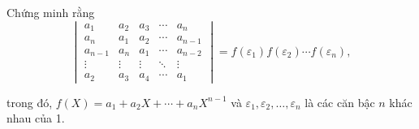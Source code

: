 \begin{exercise}
    Chứng minh rằng
    \[
        \begin{vmatrix}
            a_{1}   & a_{2}  & a_{3}  & \cdots & a_{n}   \\
            a_{n}   & a_{1}  & a_{2}  & \cdots & a_{n-1} \\
            a_{n-1} & a_{n}  & a_{1}  & \cdots & a_{n-2} \\
            \vdots  & \vdots & \vdots & \ddots & \vdots  \\
            a_{2}   & a_{3}  & a_{4}  & \cdots & a_{1}
        \end{vmatrix}
        = f(\varepsilon_{1})f(\varepsilon_{2})\cdots f(\varepsilon_{n}),
    \]
    
    trong đó, $f(X) = a_{1} + a_{2}X + \cdots + a_{n}X^{n-1}$ và $\varepsilon_{1}, \varepsilon_{2}, \ldots,\varepsilon_{n}$ là các căn bậc $n$ khác nhau của 1.
\end{exercise}

